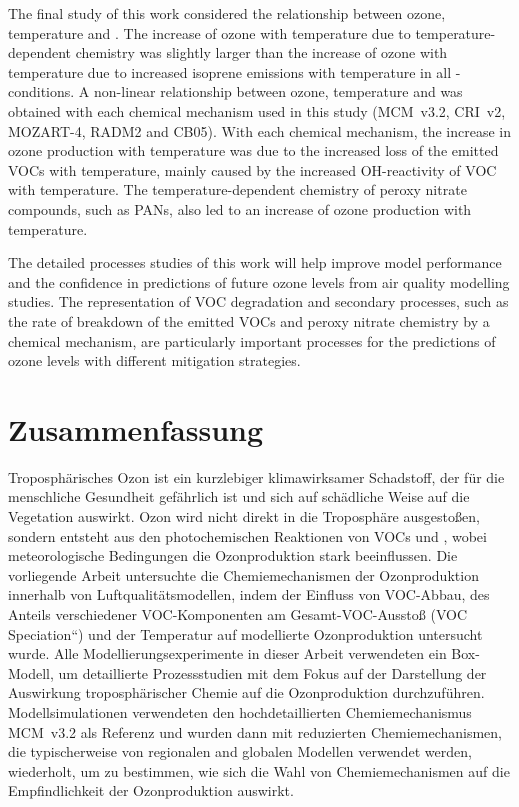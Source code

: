 The final study of this work considered the relationship between ozone, temperature and .
The increase of ozone with temperature due to temperature-dependent chemistry was slightly larger than the increase of ozone with temperature due to increased isoprene emissions with temperature in all -conditions.
A non-linear relationship between ozone, temperature and  was obtained with each chemical mechanism used in this study (MCM~v3.2, CRI~v2, MOZART-4, RADM2 and CB05).
With each chemical mechanism, the increase in ozone production with temperature was due to the increased loss of the emitted VOCs with temperature, mainly caused by the increased OH-reactivity of VOC with temperature.
The temperature-dependent chemistry of peroxy nitrate compounds, such as PANs, also led to an increase of ozone production with temperature.

The detailed processes studies of this work will help improve model performance and the confidence in predictions of future ozone levels from air quality modelling studies.
The representation of VOC degradation and secondary processes, such as the rate of breakdown of the emitted VOCs and peroxy nitrate chemistry by a chemical mechanism, are particularly important processes for the predictions of ozone levels with different mitigation strategies.

\newpage
\section{Zusammenfassung}
Troposphärisches Ozon ist ein kurzlebiger klimawirksamer Schadstoff, der für die menschliche Gesundheit gefährlich ist und sich auf schädliche Weise auf die Vegetation auswirkt.
Ozon wird nicht direkt in die Troposphäre ausgestoßen, sondern entsteht aus den photochemischen Reaktionen von VOCs und , wobei meteorologische Bedingungen die Ozonproduktion stark beeinflussen.
Die vorliegende Arbeit untersuchte die Chemiemechanismen der Ozonproduktion innerhalb von Luftqualitätsmodellen, indem der Einfluss von VOC-Abbau, des Anteils verschiedener VOC-Komponenten am Gesamt-VOC-Ausstoß (\quotedblbase VOC Speciation``) und der Temperatur auf modellierte Ozonproduktion untersucht wurde.
Alle Modellierungsexperimente in dieser Arbeit verwendeten ein Box-Modell, um detaillierte Prozessstudien mit dem Fokus auf der Darstellung der Auswirkung troposphärischer Chemie auf die Ozonproduktion durchzuführen.
Modellsimulationen verwendeten den hochdetaillierten Chemiemechanismus MCM~v3.2 als Referenz und wurden dann mit reduzierten Chemiemechanismen, die typischerweise von regionalen and globalen Modellen verwendet werden, wiederholt, um zu bestimmen, wie sich die Wahl von Chemiemechanismen auf die Empfindlichkeit der Ozonproduktion auswirkt. 

